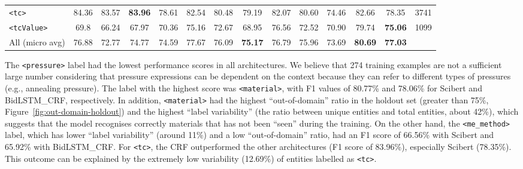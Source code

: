 \begin{table}
{\begin{tabular}{l ccc ccc ccc ccc r}
            \texttt{<tc>}         & 84.36                            & 83.57                                     & \textbf{83.96}                                     & 78.61      & 82.54      & 80.48          & 79.19          & 82.07      & 80.60          & 74.46      & 82.66          & 78.35          & 3741 \\
            \texttt{<tcValue>}    & 69.8                             & 66.24                                     & 67.97                                              & 70.36      & 75.16      & 72.67          & 68.95          & 76.56      & 72.52          & 70.90      & 79.74          & \textbf{75.06} & 1099 \\
            \midrule
            All (micro avg)       & 76.88                            & 72.77                                     & 74.77                                              & 74.59      & 77.67      & 76.09          & \textbf{75.17} & 76.79      & 75.96          & 73.69      & \textbf{80.69} & \textbf{77.03}        \\
            \bottomrule
        \end{tabular}
    }
    
    \label{tab:evaluation-superconductors-ML-model} 
\end{table}

The \texttt{<pressure>} label had the lowest performance scores in all architectures. We believe that 274 training examples are not a sufficient large number considering that pressure expressions can be dependent on the context because they can refer to different types of pressures (e.g., annealing pressure).
The label with the highest score was \texttt{<material>}, with F1 values of 80.77\% and 78.06\% for Scibert and BidLSTM\_CRF, respectively. In addition, \texttt{<material>} had the highest ``out-of-domain'' ratio in the holdout set (greater than 75\%, Figure~\ref{fig:out-domain-holdout}) and the highest ``label variability'' (the ratio between unique entities and total entities, about 42\%), which suggests that the model recognises correctly materials that has not been ``seen'' during the training.
On the other hand, the \texttt{<me\_method>} label, which has lower ``label variability'' (around 11\%) and a low ``out-of-domain'' ratio, had an F1 score of 66.56\% with Scibert and 65.92\% with BidLSTM\_CRF.
For \texttt{<tc>}, the CRF outperformed the other architectures (F1 score of 83.96\%), especially Scibert (78.35\%). 
This outcome can be explained by the extremely low variability (12.69\%) of entities labelled as \texttt{<tc>}. %

